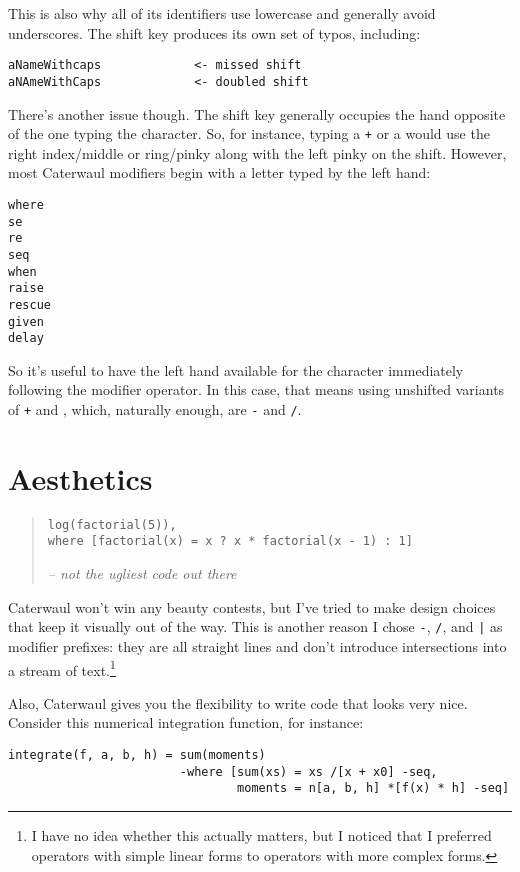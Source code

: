 \documentclass{report}
\begin{document}
    This is also why all of its identifiers use lowercase and generally avoid underscores. The shift key produces its own set of typos, including:

\begin{verbatim}
aNameWithcaps             <- missed shift
aNAmeWithCaps             <- doubled shift
\end{verbatim}

    There's another issue though. The shift key generally occupies the hand opposite of the one typing the character. So, for instance, typing a {\tt +} or a {\tt *} would use the right
    index/middle or ring/pinky along with the left pinky on the shift. However, most Caterwaul modifiers begin with a letter typed by the left hand:

\begin{verbatim}
where
se
re
seq
when
raise
rescue
given
delay
\end{verbatim}

    So it's useful to have the left hand available for the character immediately following the modifier operator. In this case, that means using unshifted variants of {\tt +} and {\tt *},
    which, naturally enough, are {\tt -} and {\tt /}.

\section{Aesthetics}
\begin{quote}
\begin{verbatim}
log(factorial(5)),
where [factorial(x) = x ? x * factorial(x - 1) : 1]
\end{verbatim}
\hfill \textit{-- not the ugliest code out there}
\end{quote}

    Caterwaul won't win any beauty contests, but I've tried to make design choices that keep it visually out of the way. This is another reason I chose {\tt -}, {\tt /}, and {\tt |} as
    modifier prefixes: they are all straight lines and don't introduce intersections into a stream of text.\footnote{I have no idea whether this actually matters, but I noticed that I
    preferred operators with simple linear forms to operators with more complex forms.}

    Also, Caterwaul gives you the flexibility to write code that looks very nice. Consider this numerical integration function, for instance:

\begin{verbatim}
integrate(f, a, b, h) = sum(moments)
                        -where [sum(xs) = xs /[x + x0] -seq,
                                moments = n[a, b, h] *[f(x) * h] -seq]
\end{verbatim}
\end{document}
